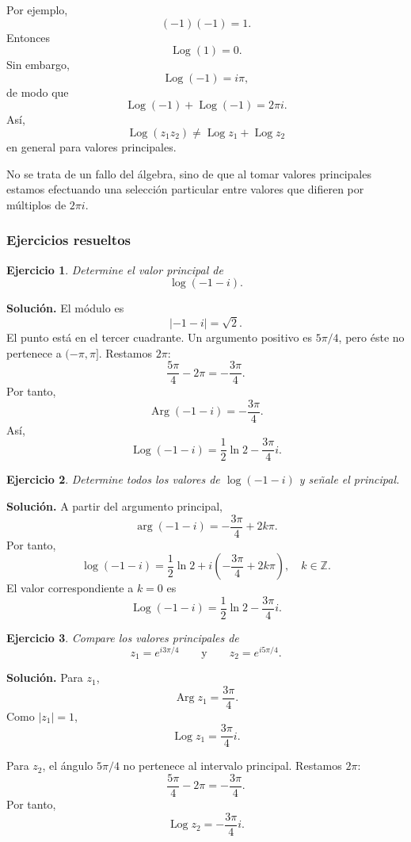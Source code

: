 \documentclass[12pt]{article}
\DeclareMathOperator{\Arg}{Arg}
\DeclareMathOperator{\Log}{Log}
\newtheorem{ejercicio}{Ejercicio}[section]
\begin{document}
Por ejemplo,
\[
(-1)(-1)=1.
\]
Entonces
\[
\operatorname{Log}(1)=0.
\]
Sin embargo,
\[
\operatorname{Log}(-1)=i\pi,
\]
de modo que
\[
\operatorname{Log}(-1)+\operatorname{Log}(-1)=2\pi i.
\]
Así,
\[
\boxed{
\operatorname{Log}(z_1z_2)
\neq
\operatorname{Log}z_1+\operatorname{Log}z_2
}
\]
en general para valores principales.

No se trata de un fallo del álgebra, sino de que al tomar valores principales
estamos efectuando una selección particular entre valores que difieren por
múltiplos de $2\pi i$.
\subsubsection*{Ejercicios resueltos}
\begin{ejercicio}
Determine el valor principal de
\[
\log(-1-i).
\]
\end{ejercicio}

\textbf{Solución.}
El módulo es
\[
|-1-i|=\sqrt2.
\]
El punto está en el tercer cuadrante. Un argumento positivo es $5\pi/4$, pero
éste no pertenece a $(-\pi,\pi]$. Restamos $2\pi$:
\[
\frac{5\pi}{4}-2\pi=-\frac{3\pi}{4}.
\]
Por tanto,
\[
\Arg(-1-i)=-\frac{3\pi}{4}.
\]
Así,
\[
\boxed{
\operatorname{Log}(-1-i)
=
\frac12\ln2-\frac{3\pi}{4}i.
}
\]

\begin{ejercicio}
Determine todos los valores de $\log(-1-i)$ y señale el principal.
\end{ejercicio}

\textbf{Solución.}
A partir del argumento principal,
\[
\arg(-1-i)
=
-\frac{3\pi}{4}+2k\pi.
\]
Por tanto,
\[
\boxed{
\log(-1-i)
=
\frac12\ln2
+i\left(-\frac{3\pi}{4}+2k\pi\right),
\quad k\in\mathbb Z.
}
\]
El valor correspondiente a $k=0$ es
\[
\boxed{
\operatorname{Log}(-1-i)
=
\frac12\ln2-\frac{3\pi}{4}i.
}
\]

\begin{ejercicio}
Compare los valores principales de
\[
z_1=e^{i3\pi/4}
\qquad\text{y}\qquad
z_2=e^{i5\pi/4}.
\]
\end{ejercicio}

\textbf{Solución.}
Para $z_1$,
\[
\Arg z_1=\frac{3\pi}{4}.
\]
Como $|z_1|=1$,
\[
\Log z_1=\frac{3\pi}{4}i.
\]

Para $z_2$, el ángulo $5\pi/4$ no pertenece al intervalo principal. Restamos
$2\pi$:
\[
\frac{5\pi}{4}-2\pi=-\frac{3\pi}{4}.
\]
Por tanto,
\[
\Log z_2=-\frac{3\pi}{4}i.
\]
\end{document}
